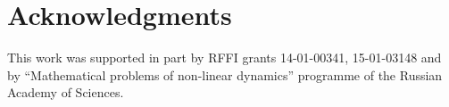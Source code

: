 \documentclass[12pt]{article}
\begin{document}



\section*{Acknowledgments}
	This work was supported in part by RFFI grants 14-01-00341, 15-01-03148
	and by ``Mathematical problems of non-linear dynamics'' programme
	of the Russian Academy of Sciences.
\end{document}
